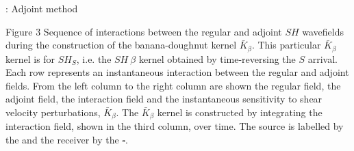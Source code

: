 

\begin{frame}{\titleprefix: Adjoint method}

  \centering

  \begin{minipage}{0.5\textwidth}
  \end{minipage}
  \hspace{0.5cm}
  \begin{minipage}{0.42\textwidth}
    \tiny
    \begin{figureblock}{Figure 3}
      Sequence of interactions between the regular and adjoint $SH$ wavefields
      during the construction of the banana-doughnut kernel $\bar K_{\beta}$.
      This particular $\bar K_{\beta}$ kernel is for $SH_S$, i.e.
      the $SH~\beta$ kernel obtained by time-reversing the $S$ arrival.
      Each row represents an instantaneous interaction between the regular and
      adjoint fields.
      From the left column to the right column are shown the regular field,
      the adjoint field, the interaction field and the instantaneous sensitivity
      to shear velocity perturbations, $\bar K_{\beta}$.
      The $\bar K_{\beta}$ kernel is constructed by integrating the interaction
      field, shown in the third column, over time.
      The source is labelled by the \faStarO{} and
      the receiver by the $\square$.
    \end{figureblock}
  \end{minipage}

\end{frame}

